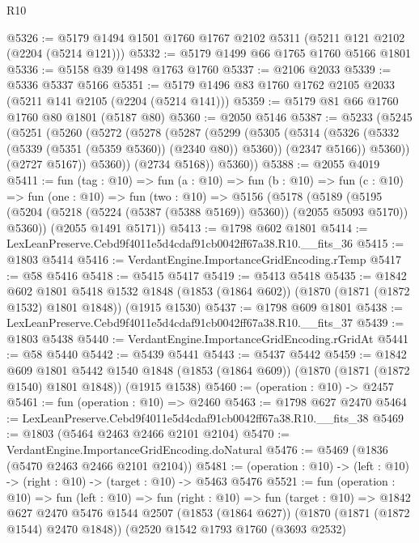 \begin{lexlean}{R10}
\begin{coremodule}
@5326 := @5179 @1494 @1501 @1760 @1767 @2102 @5311 (@5211 @121 @2102 (@2204 (@5214 @121)))
@5332 := @5179 @1499 @66 @1765 @1760 @5166 @1801
@5336 := @5158 @39 @1498 @1763 @1760
@5337 := @2106 @2033
@5339 := @5336 @5337 @5166
@5351 := @5179 @1496 @83 @1760 @1762 @2105 @2033 (@5211 @141 @2105 (@2204 (@5214 @141)))
@5359 := @5179 @81 @66 @1760 @1760 @80 @1801 (@5187 @80)
@5360 := @2050 @5146
@5387 := @5233
    (@5245
      (@5251
        (@5260
          (@5272
            (@5278
              (@5287
                (@5299
                  (@5305
                    (@5314
                      (@5326 (@5332 (@5339 (@5351 (@5359 @5360)) (@2340 @80)) @5360))
                      (@2347 @5166))
                    @5360))
                (@2727 @5167))
              @5360))
          (@2734 @5168))
        @5360))
@5388 := @2055 @4019
@5411 := fun (tag : @10) =>
  fun (a : @10) =>
  fun (b : @10) =>
  fun (c : @10) =>
  fun (one : @10) =>
  fun (two : @10) =>
  @5156
    (@5178
      (@5189 (@5195 (@5204 (@5218 (@5224 (@5387 (@5388 @5169)) @5360)) (@2055 @5093 @5170)) @5360))
      (@2055 @1491 @5171))
@5413 := @1798 @602 @1801
@5414 := LexLeanPreserve.Cebd9f4011e5d4cdaf91cb0042ff67a38.R10.__fits_36
@5415 := @1803 @5414
@5416 := VerdantEngine.ImportanceGridEncoding.rTemp
@5417 := @58 @5416
@5418 := @5415 @5417
@5419 := @5413 @5418
@5435 := @1842
    @602
    @1801
    @5418
    @1532
    @1848
    (@1853 (@1864 @602))
    (@1870 (@1871 (@1872 @1532) @1801 @1848))
    (@1915 @1530)
@5437 := @1798 @609 @1801
@5438 := LexLeanPreserve.Cebd9f4011e5d4cdaf91cb0042ff67a38.R10.__fits_37
@5439 := @1803 @5438
@5440 := VerdantEngine.ImportanceGridEncoding.rGridAt
@5441 := @58 @5440
@5442 := @5439 @5441
@5443 := @5437 @5442
@5459 := @1842
    @609
    @1801
    @5442
    @1540
    @1848
    (@1853 (@1864 @609))
    (@1870 (@1871 (@1872 @1540) @1801 @1848))
    (@1915 @1538)
@5460 := (operation : @10) -> @2457
@5461 := fun (operation : @10) => @2460
@5463 := @1798 @627 @2470
@5464 := LexLeanPreserve.Cebd9f4011e5d4cdaf91cb0042ff67a38.R10.__fits_38
@5469 := @1803 (@5464 @2463 @2466 @2101 @2104)
@5470 := VerdantEngine.ImportanceGridEncoding.doNatural
@5476 := @5469 (@1836 (@5470 @2463 @2466 @2101 @2104))
@5481 := (operation : @10) -> (left : @10) -> (right : @10) -> (target : @10) -> @5463 @5476
@5521 := fun (operation : @10) =>
  fun (left : @10) =>
  fun (right : @10) =>
  fun (target : @10) =>
  @1842
    @627
    @2470
    @5476
    @1544
    @2507
    (@1853 (@1864 @627))
    (@1870 (@1871 (@1872 @1544) @2470 @1848))
    (@2520
      @1542
      @1793
      @1760
      (@3693 @2532)

\end{coremodule}
\end{lexlean}
